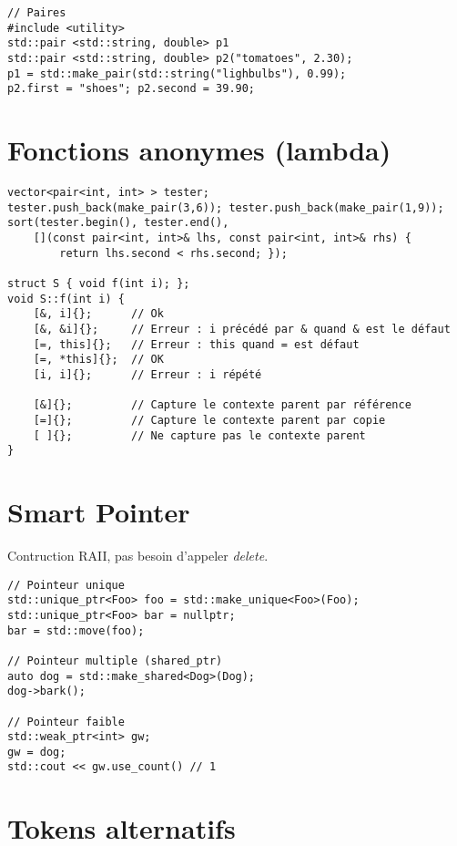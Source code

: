 \documentclass{article}
\begin{document}
\begin{multicols*}{3}
\begin{lstlisting}
// Paires
#include <utility>
std::pair <std::string, double> p1
std::pair <std::string, double> p2("tomatoes", 2.30);
p1 = std::make_pair(std::string("lighbulbs"), 0.99);
p2.first = "shoes"; p2.second = 39.90;

\end{lstlisting}

\section*{Fonctions anonymes (lambda)}

\begin{lstlisting}
vector<pair<int, int> > tester;
tester.push_back(make_pair(3,6)); tester.push_back(make_pair(1,9));
sort(tester.begin(), tester.end(),
    [](const pair<int, int>& lhs, const pair<int, int>& rhs) {
        return lhs.second < rhs.second; });

struct S { void f(int i); };
void S::f(int i) {
    [&, i]{};      // Ok
    [&, &i]{};     // Erreur : i précédé par & quand & est le défaut
    [=, this]{};   // Erreur : this quand = est défaut
    [=, *this]{};  // OK
    [i, i]{};      // Erreur : i répété

    [&]{};         // Capture le contexte parent par référence
    [=]{};         // Capture le contexte parent par copie
    [ ]{};         // Ne capture pas le contexte parent
}

\end{lstlisting}

\section*{Smart Pointer}

Contruction RAII, pas besoin d'appeler \emph{delete}.

\begin{lstlisting}
// Pointeur unique
std::unique_ptr<Foo> foo = std::make_unique<Foo>(Foo);
std::unique_ptr<Foo> bar = nullptr;
bar = std::move(foo);

// Pointeur multiple (shared_ptr)
auto dog = std::make_shared<Dog>(Dog);
dog->bark();

// Pointeur faible
std::weak_ptr<int> gw;
gw = dog;
std::cout << gw.use_count() // 1

\end{lstlisting}

\section*{Tokens alternatifs}


\end{multicols*}
\end{document}
